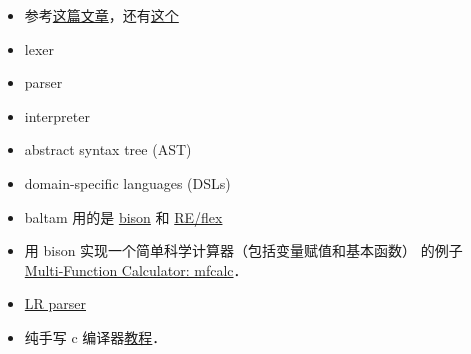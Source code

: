 
\begin{issues}
\issueDraft
\end{issues}

\begin{itemize}
\item 参考\href{https://www.toptal.com/scala/writing-an-interpreter}{这篇文章}，还有\href{https://www.youtube.com/watch?v=Xu4RtLlm42I}{这个}

\item lexer
\item parser
\item interpreter
\item abstract syntax tree (AST)
\item domain-specific languages (DSLs)
\item baltam 用的是 \href{https://www.gnu.org/software/bison/}{bison} 和 \href{https://www.genivia.com/doc/reflex/html/}{RE/flex}
\item 用 bison 实现一个简单科学计算器（包括变量赋值和基本函数） 的例子 \href{http://web.mit.edu/gnu/doc/html/bison_5.html}{Multi-Function Calculator: mfcalc}．
\item \href{https://en.wikipedia.org/wiki/LR_parser}{LR parser}
\item 纯手写 c 编译器\href{https://norasandler.com/2017/11/29/Write-a-Compiler.html}{教程}．
\end{itemize}
